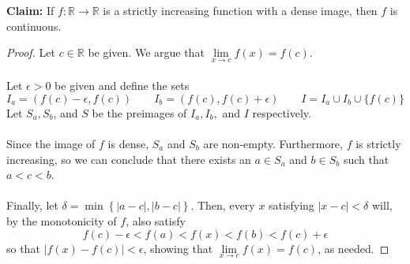 \documentclass{article}
\begin{document}
\section*{}
\textbf{Claim:} If \(f : \mathbb{R} \to \mathbb{R}\) is a strictly increasing function with a dense image, then \(f\) is continuous.
\begin{proof}
    Let \(c \in \mathbb{R}\) be given. We argue that \(\lim\limits_{x \to c} f(x) = f(c)\). \\ \\
    Let \(\epsilon > 0\) be given and define the sets \[
        I_a = (f(c) - \epsilon, f(c)) \qquad I_b = (f(c), f(c) + \epsilon) \qquad I = I_a \cup I_b \cup \{f(c)\}
    \]Let \(S_a, S_b\), and \(S\) be the preimages of \(I_a, I_b,\) and \(I\) respectively. \\ \\ Since the image of \(f\) is dense, \(S_a\) and \(S_b\) are non-empty. Furthermore, \(f\) is strictly increasing, so we can conclude that there exists an \(a \in S_a\) and \(b \in S_b\) such that \(a < c < b\). \\ \\
    Finally, let \(\delta = \min \left\{|a - c|, |b - c|\right\}\). Then, every \(x\) satisfying \(|x - c| < \delta\) will, by the monotonicity of \(f\), also satisfy \[
        f(c) - \epsilon < f(a) < f(x) < f(b) < f(c) + \epsilon
    \] so that \(|f(x) - f(c)| < \epsilon\), showing that \(\lim\limits_{x \to c} f(x) = f(c)\), as needed.
\end{proof}
\end{document}
